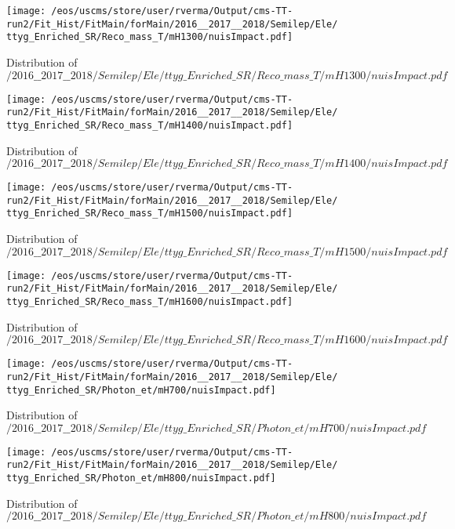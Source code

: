 \begin{figure}
\centering
\texttt{[image: /eos/uscms/store/user/rverma/Output/cms-TT-run2/Fit\_Hist/FitMain/forMain/2016\_\_2017\_\_2018/Semilep/Ele/ttyg\_Enriched\_SR/Reco\_mass\_T/mH1300/nuisImpact.pdf]}
\caption{Distribution of $/2016\_\_2017\_\_2018/Semilep/Ele/ttyg\_Enriched\_SR/Reco\_mass\_T/mH1300/nuisImpact.pdf$}
\end{figure}

\begin{figure}
\centering
\texttt{[image: /eos/uscms/store/user/rverma/Output/cms-TT-run2/Fit\_Hist/FitMain/forMain/2016\_\_2017\_\_2018/Semilep/Ele/ttyg\_Enriched\_SR/Reco\_mass\_T/mH1400/nuisImpact.pdf]}
\caption{Distribution of $/2016\_\_2017\_\_2018/Semilep/Ele/ttyg\_Enriched\_SR/Reco\_mass\_T/mH1400/nuisImpact.pdf$}
\end{figure}

\begin{figure}
\centering
\texttt{[image: /eos/uscms/store/user/rverma/Output/cms-TT-run2/Fit\_Hist/FitMain/forMain/2016\_\_2017\_\_2018/Semilep/Ele/ttyg\_Enriched\_SR/Reco\_mass\_T/mH1500/nuisImpact.pdf]}
\caption{Distribution of $/2016\_\_2017\_\_2018/Semilep/Ele/ttyg\_Enriched\_SR/Reco\_mass\_T/mH1500/nuisImpact.pdf$}
\end{figure}

\begin{figure}
\centering
\texttt{[image: /eos/uscms/store/user/rverma/Output/cms-TT-run2/Fit\_Hist/FitMain/forMain/2016\_\_2017\_\_2018/Semilep/Ele/ttyg\_Enriched\_SR/Reco\_mass\_T/mH1600/nuisImpact.pdf]}
\caption{Distribution of $/2016\_\_2017\_\_2018/Semilep/Ele/ttyg\_Enriched\_SR/Reco\_mass\_T/mH1600/nuisImpact.pdf$}
\end{figure}

\begin{figure}
\centering
\texttt{[image: /eos/uscms/store/user/rverma/Output/cms-TT-run2/Fit\_Hist/FitMain/forMain/2016\_\_2017\_\_2018/Semilep/Ele/ttyg\_Enriched\_SR/Photon\_et/mH700/nuisImpact.pdf]}
\caption{Distribution of $/2016\_\_2017\_\_2018/Semilep/Ele/ttyg\_Enriched\_SR/Photon\_et/mH700/nuisImpact.pdf$}
\end{figure}

\begin{figure}
\centering
\texttt{[image: /eos/uscms/store/user/rverma/Output/cms-TT-run2/Fit\_Hist/FitMain/forMain/2016\_\_2017\_\_2018/Semilep/Ele/ttyg\_Enriched\_SR/Photon\_et/mH800/nuisImpact.pdf]}
\caption{Distribution of $/2016\_\_2017\_\_2018/Semilep/Ele/ttyg\_Enriched\_SR/Photon\_et/mH800/nuisImpact.pdf$}
\end{figure}

